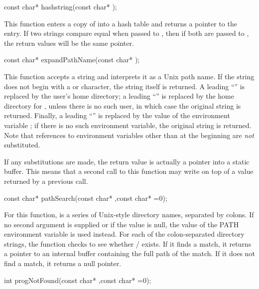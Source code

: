 \begin{example}
const char* hashstring(const char* );
\end{example}

This function enters a copy of  into a hash table and returns
a pointer to the entry.  If two strings compare equal when passed to
, then if both are passed to , the return
values will be the same pointer.

\begin{example}
const char* expandPathName(const char* );
\end{example}

This function accepts a string and interprets it as a Unix path name.
If the string does not begin with a \code{~} or \code{$} character,
the string itself is returned.  A leading ``\code{~/}'' is replaced
by the user's home directory; a leading ``'' is
replaced by the home directory for , unless there is no
such user, in which case the original string is returned.  Finally,
a leading ``'' is replaced by the value of the
environment variable ; if there is no such environment
variable, the original string is returned.  Note that references
to environment variables other than at the beginning are \emph{not}
substituted.

If any substitutions are made, the return value is actually a pointer
into a static buffer.  This means that a second call to this function
may write on top of a value returned by a previous call.

\begin{example}
const char* pathSearch(const char* ,const char* =0);
\end{example}

For this function,  is a series of Unix-style directory names,
separated by colons.  If no second argument is supplied or if the value
is null, the value of the PATH environment variable is used instead.
For each of the colon-separated directory strings, the function checks
to see whether / exists.  If it finds a match, it
returns a pointer to an internal buffer containing the full path of the
match.  If it does not find a match, it returns a null pointer.

\begin{example}
int progNotFound(const char* ,const char* =0);
\end{example}

